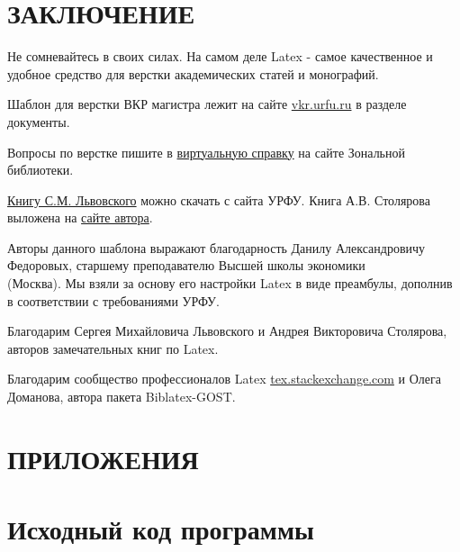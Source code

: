 \chapter*{ЗАКЛЮЧЕНИЕ}

Не сомневайтесь в своих силах. На самом деле Latex - самое качественное и удобное средство для верстки академических статей и монографий.

Шаблон для верстки ВКР магистра лежит на сайте \href{http://vkr.urfu.ru/}{vkr.urfu.ru} в разделе документы.

Вопросы по верстке пишите в \href{http://lib.urfu.ru/course/view.php?id=83}{виртуальную справку} на сайте Зональной библиотеки.

\href{http://lib.urfu.ru/file.php/154/LaTeX-book.pdf}{Книгу С.М. Львовского} можно скачать с сайта УРФУ. Книга А.В. Столярова выложена на \href{http://www.stolyarov.info/books/latex3days}{сайте автора}.

Авторы данного шаблона выражают благодарность Данилу Александровичу Федоровых, старшему преподавателю Высшей школы экономики\\(Москва). Мы взяли за основу его настройки Latex в виде преамбулы, дополнив в соответствии с требованиями УРФУ.

Благодарим Сергея Михайловича Львовского и Андрея Викторовича Столярова, авторов замечательных книг по Latex.

Благодарим сообщество профессионалов Latex \href{tex.stackexchange.com}{tex.stackexchange.com} и Олега Доманова, автора пакета Biblatex-GOST.



\printbibliography
[title=Список \\использованных источников]
\appendix
\chapter*{ПРИЛОЖЕНИЯ}

\chapter{Исходный код программы}
\lstset{
	language=[Sharp]C,
	breaklines=true,
	basicstyle=\footnotesize\ttfamily}
\linespread{1}






